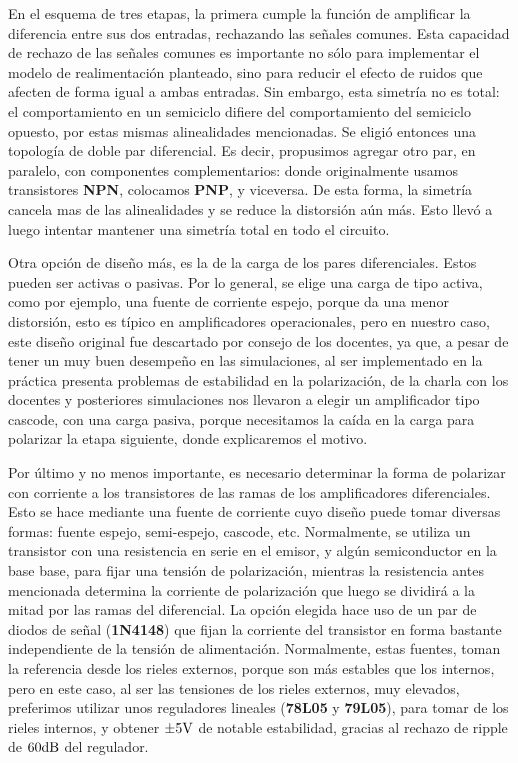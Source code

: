 En el esquema de tres etapas, la primera cumple la función de amplificar la diferencia entre sus dos entradas, rechazando las señales comunes. Esta capacidad de rechazo de las señales comunes es importante no sólo para implementar el modelo de realimentación planteado, sino para reducir el efecto de ruidos que afecten de forma igual a ambas entradas.
Sin embargo, esta simetría no es total: el comportamiento en un semiciclo difiere del comportamiento del semiciclo opuesto, por estas mismas alinealidades mencionadas. Se eligió entonces una topología de doble par diferencial. Es decir, propusimos agregar otro par, en paralelo, con componentes complementarios: donde originalmente usamos transistores \textbf{NPN}, colocamos \textbf{PNP}, y viceversa. De esta forma, la simetría cancela mas de las alinealidades y se reduce la distorsión aún más. Esto llevó a luego intentar mantener una simetría total en todo el circuito. 


Otra opción de diseño más, es la de la carga de los pares diferenciales. Estos pueden ser activas o pasivas. Por lo general, se elige una carga de tipo activa, como por ejemplo, una fuente de corriente espejo, porque da una menor distorsión, esto es típico en amplificadores operacionales, pero en nuestro caso, este diseño original fue descartado por consejo de los docentes, ya que, a pesar de tener un muy buen desempeño en las simulaciones, al ser implementado en la práctica presenta problemas de estabilidad en la polarización, de la charla con los docentes y posteriores simulaciones nos llevaron a elegir un amplificador tipo cascode, con una carga pasiva, porque necesitamos la caída en la carga para polarizar la etapa siguiente, donde explicaremos el motivo. 



Por último y no menos importante, es necesario determinar la forma de polarizar con corriente a los transistores de las ramas de los amplificadores diferenciales. Esto se hace mediante una fuente de corriente cuyo diseño puede tomar diversas formas: fuente espejo, semi-espejo, cascode, etc. Normalmente, se utiliza un transistor con una resistencia en serie en el emisor, y algún semiconductor en la base base, para fijar una tensión de polarización, mientras la resistencia antes mencionada determina la corriente de polarización que luego se dividirá a la mitad por las ramas del diferencial. La opción elegida hace uso de un par de diodos de señal (\textbf{1N4148}) que fijan la corriente del transistor en forma bastante independiente de la tensión de alimentación. Normalmente, estas fuentes, toman la referencia desde los rieles externos, porque son más estables que los internos, pero en este caso, al ser las tensiones de los rieles externos, muy elevados, preferimos utilizar unos reguladores lineales (\textbf{78L05} y \textbf{79L05}), para tomar de los rieles internos, y obtener $\pm 5 \si[per-mode=symbol]{\volt}$ de notable estabilidad, gracias al rechazo de ripple de $60 \si[per-mode=symbol]{\decibel}$ del regulador.



